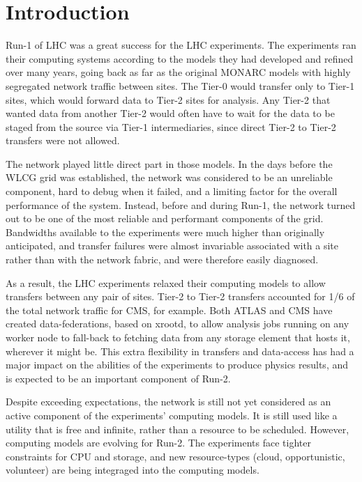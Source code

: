 \section{Introduction}

Run-1 of LHC was a great success for the LHC experiments. The experiments ran their computing systems according to the models they had developed and refined over many years, going back as far as the original MONARC\cite{MONARC} models with highly segregated network traffic between sites. The Tier-0 would transfer only to Tier-1 sites, which would forward data to Tier-2 sites for analysis. Any Tier-2 that wanted data from another Tier-2 would often have to wait for the data to be staged from the source via Tier-1 intermediaries, since direct Tier-2 to Tier-2 transfers were not allowed.

The network played little direct part in those models. In the days before the WLCG grid\cite{WLCG} was established, the network was considered to be an unreliable component, hard to debug when it failed, and a limiting factor for the overall performance of the system. Instead, before and during Run-1, the network turned out to be one of the most reliable and performant components of the grid. Bandwidths available to the experiments were much higher than originally anticipated, and transfer failures were almost invariable associated with a site rather than with the network fabric, and were therefore easily diagnosed.

As a result, the LHC experiments relaxed their computing models to allow transfers between any pair of sites. Tier-2 to Tier-2 transfers accounted for 1/6 of the total network traffic for CMS, for example. Both ATLAS and CMS have created data-federations, based on xrootd\cite{xrootd}, to allow analysis jobs running on any worker node to fall-back to fetching data from any storage element that hosts it, wherever it might be. This extra flexibility in transfers and data-access has had a major impact on the abilities of the experiments to produce physics results, and is expected to be an important component of Run-2.

Despite exceeding expectations, the network is still not yet considered as an active component of the experiments' computing models. It is still used like a utility that is free and infinite, rather than a resource to be scheduled. However, computing models are evolving for Run-2. The experiments face tighter constraints for CPU and storage, and new resource-types (cloud, opportunistic, volunteer) are being integraged into the computing models.


